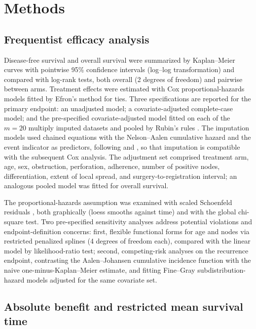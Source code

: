 \section{Methods}\label{sec:methods}

\subsection{Frequentist efficacy analysis}\label{sec:methods-freq}

Disease-free survival and overall survival were summarized by
Kaplan--Meier curves with pointwise 95\% confidence intervals (log--log
transformation) and compared with log-rank tests, both overall (2 degrees
of freedom) and pairwise between arms. Treatment effects were estimated
with Cox proportional-hazards models fitted by Efron's method for ties.
Three specifications are reported for the primary endpoint: an unadjusted
model; a covariate-adjusted complete-case model; and the pre-specified
covariate-adjusted model fitted on each of the $m=20$ multiply imputed
datasets and pooled by Rubin's rules \citep{rubin1987}. The imputation
models used chained equations with the Nelson--Aalen cumulative hazard
and the event indicator as predictors, following
\citet{white2009} and \citet{mice2011}, so that imputation is
compatible with the subsequent Cox analysis. The adjustment set
comprised treatment arm, age, sex, obstruction, perforation, adherence,
number of positive nodes, differentiation, extent of local spread, and
surgery-to-registration interval; an analogous pooled model was fitted
for overall survival.

The proportional-hazards assumption was examined with scaled
Schoenfeld residuals \citep{grambsch1994}, both graphically (loess
smooths against time) and with the global chi-square test. Two
pre-specified sensitivity analyses address potential violations and
endpoint-definition concerns: first, flexible functional forms for age
and nodes via restricted penalized splines (4 degrees of freedom each),
compared with the linear model by likelihood-ratio test; second,
competing-risk analyses on the recurrence endpoint, contrasting the
Aalen--Johansen cumulative incidence function
\citep{aalen1978} with the naive one-minus-Kaplan--Meier estimate, and
fitting Fine--Gray subdistribution-hazard models \citep{finegray1999}
adjusted for the same covariate set.

\subsection{Absolute benefit and restricted mean survival time}
\label{sec:methods-rmst}

